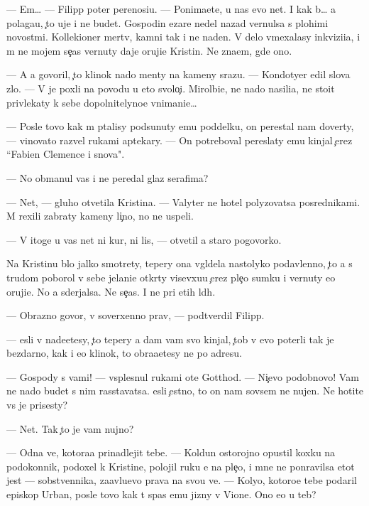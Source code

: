 \documentclass[10pt]{book}
\begin{document}
— Em… — Filipp poter perenosi{\q}u. — Ponima{\y}ete, u nas {\y}evo net. I kak b{\yi}… {\y}a polaga{\y}u, {\c}to uje i ne budet. Gospodin {\C}ezare nedel{\iu} nazad vernulsa s plohimi novost{\ia}mi. Kollek{\q}ioner mertv, kamni tak i ne na{\y}den{\yi}. V delo vmexalasy inkvizi{\q}i{\y}a, i m{\yi} ne mojem se{\y}{\c}as vernuty daje oruji{\y}e Kristin{\yi}. Ne zna{\y}em, gde ono.

— A {\y}a govoril, {\c}to klinok nado men{\ia}ty na kameny srazu. — Kondotyer {\q}edil slova zlo. — V{\yi} je poxli na povodu u eto{\y} svolo{\c}i. Mirol{\iu}bi{\y}e, ne nado nasili{\y}a, ne sto{\y}it privlekaty k sebe dopolnitelyno{\y}e vnimani{\y}e…

— Posle tovo kak m{\yi} p{\yi}talisy podsunuty {\y}emu poddelku, on perestal nam dover{\ia}ty, — vinovato razvel rukami aptekary. — On potreboval pereslaty {\y}emu kinjal {\c}erez ``Fabien Clemence i s{\yi}nov{\y}a".

— No obmanul vas i ne peredal glaz serafima?

— Net, — gluho otvetila Kristina. — Valyter ne hotel polyzovatsa posrednikami. M{\yi} rexili zabraty kameny li{\c}no, no ne uspeli.

— V itoge u vas net ni kur, ni lis{\yi}, — otvetil {\y}a staro{\y} pogovorko{\y}.

Na Kristinu b{\yi}lo jalko smotrety, tepery ona v{\yi}gl{\ia}dela nastolyko podavlenno{\y}, {\c}to {\y}a s trudom poborol v sebe jelani{\y}e otkr{\yi}ty visevxu{\y}u {\c}erez ple{\c}o sumku i vernuty {\y}e{\y}o oruji{\y}e. No {\y}a sderjalsa. Ne se{\y}{\c}as. I ne pri etih l{\iu}d{\ia}h.

— Obrazno govor{\ia}, v{\yi} soverxenno prav{\yi}, — podtverdil Filipp.

— {\Y}esli v{\yi} nade{\y}etesy, {\c}to tepery {\y}a dam vam svo{\y} kinjal, {\c}tob{\yi} v{\yi} {\y}evo poter{\ia}li tak je bezdarno, kak i {\y}e{\y}o klinok, to obra{\x}a{\y}etesy ne po adresu.

— Gospody s vami! — vsplesnul rukami ote{\q} Gotthod. — Ni{\c}evo podobnovo! Vam ne nado budet s nim rasstavatsa. {\Y}esli {\c}estno, to on nam sovsem ne nujen. Ne hotite vs{\e} je prisesty?

— Net. Tak {\c}to je vam nujno?

— Odna ve{\x}, kotora{\y}a prinadlejit tebe. — Koldun ostorojno opustil koxku na podokonnik, podoxel k Kristine, polojil ruku {\y}e{\y} na ple{\c}o, i mne ne ponravilsa etot jest — sobstvennika, za{\y}avl{\ia}{\y}u{\x}evo prava na svo{\y}u ve{\x}. — Koly{\q}o, kotoro{\y}e tebe podaril {\y}episkop Urban, posle tovo kak t{\yi} spas {\y}emu jizny v Vione. Ono {\y}e{\x}o u teb{\ia}?
\end{document}
